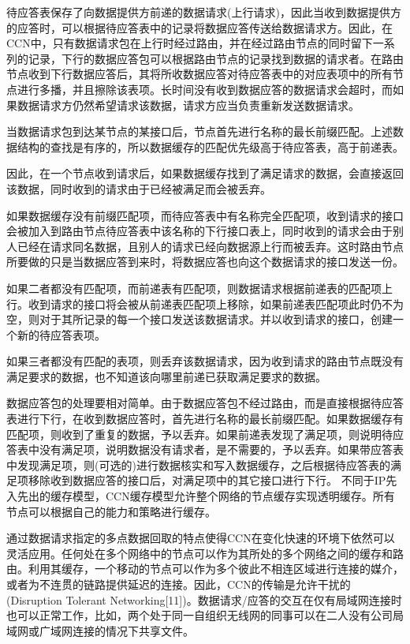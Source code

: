 待应答表保存了向数据提供方前递的数据请求(上行请求)，因此当收到数据提供方的应答时，可以根据待应答表中的记录将数据应答传送给数据请求方。因此，在CCN中，只有数据请求包在上行时经过路由，并在经过路由节点的同时留下一系列的记录，下行的数据应答包可以根据路由节点的记录找到数据的请求者。在路由节点收到下行数据应答后，其将所收数据应答对待应答表中的对应表项中的所有节点进行多播，并且擦除该表项。长时间没有收到数据应答的数据请求会超时，而如果数据请求方仍然希望请求该数据，请求方应当负责重新发送数据请求。
\par
当数据请求包到达某节点的某接口后，节点首先进行名称的最长前缀匹配。上述数据结构的查找是有序的，所以数据缓存的匹配优先级高于待应答表，高于前递表。
\par
因此，在一个节点收到请求后，如果数据缓存找到了满足请求的数据，会直接返回该数据，同时收到的请求由于已经被满足而会被丢弃。
\par
如果数据缓存没有前缀匹配项，而待应答表中有名称完全匹配项，收到请求的接口会被加入到路由节点待应答表中该名称的下行接口表上，同时收到的请求会由于别人已经在请求同名数据，且别人的请求已经向数据源上行而被丢弃。这时路由节点所要做的只是当数据应答到来时，将数据应答也向这个数据请求的接口发送一份。
\par
如果二者都没有匹配项，而前递表有匹配项，则数据请求根据前递表的匹配项上行。收到请求的接口将会被从前递表匹配项上移除，如果前递表匹配项此时仍不为空，则对于其所记录的每一个接口发送该数据请求。并以收到请求的接口，创建一个新的待应答表项。
\par
如果三者都没有匹配的表项，则丢弃该数据请求，因为收到请求的路由节点既没有满足要求的数据，也不知道该向哪里前递已获取满足要求的数据。
\par
数据应答包的处理要相对简单。由于数据应答包不经过路由，而是直接根据待应答表进行下行，在收到数据应答时，首先进行名称的最长前缀匹配。如果数据缓存有匹配项，则收到了重复的数据，予以丢弃。如果前递表发现了满足项，则说明待应答表中没有满足项，说明数据没有请求者，是不需要的，予以丢弃。如果带应答表中发现满足项，则(可选的)进行数据核实和写入数据缓存，之后根据待应答表的满足项移除收到数据应答的接口后，对满足项中的其它接口进行下行。
不同于IP先入先出的缓存模型，CCN缓存模型允许整个网络的节点缓存实现透明缓存。所有节点可以根据自己的能力和策略进行缓存。
\par
通过数据请求指定的多点数据回取的特点使得CCN在变化快速的环境下依然可以灵活应用。任何处在多个网络中的节点可以作为其所处的多个网络之间的缓存和路由。利用其缓存，一个移动的节点可以作为多个彼此不相连区域进行连接的媒介，或者为不连贯的链路提供延迟的连接。因此，CCN的传输是允许干扰的(Disruption Tolerant Networking[11])。数据请求/应答的交互在仅有局域网连接时也可以正常工作，比如，两个处于同一自组织无线网的同事可以在二人没有公司局域网或广域网连接的情况下共享文件。
